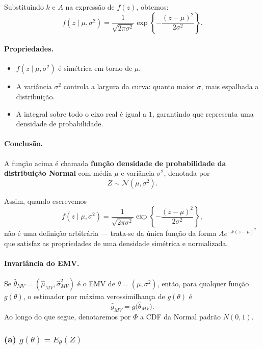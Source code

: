 Substituindo $k$ e $A$ na expressão de $f(z)$, obtemos:
\[
f(z\mid\mu,\sigma^2)
= \frac{1}{\sqrt{2\pi\sigma^2}}
\exp\!\left\{-\frac{(z-\mu)^2}{2\sigma^2}\right\}.
\]

\paragraph{Propriedades.}
\begin{itemize}
    \item $f(z\mid\mu,\sigma^2)$ é simétrica em torno de $\mu$.
    \item A variância $\sigma^2$ controla a largura da curva: quanto maior $\sigma$, mais espalhada a distribuição.
    \item A integral sobre todo o eixo real é igual a $1$, garantindo que representa uma densidade de probabilidade.
\end{itemize}

\paragraph{Conclusão.}
A função acima é chamada \textbf{função densidade de probabilidade da distribuição Normal} com média $\mu$ e variância $\sigma^2$, denotada por
\[
Z \sim \mathcal N(\mu,\sigma^2).
\]

Assim, quando escrevemos
\[
f(z\mid \mu,\sigma^2) = \frac{1}{\sqrt{2\pi\sigma^2}}
\exp\!\left\{-\frac{(z-\mu)^2}{2\sigma^2}\right\},
\]
não é uma definição arbitrária — trata-se da única função da forma $Ae^{-k(z-\mu)^2}$ que satisfaz as propriedades de uma densidade simétrica e normalizada.


\paragraph{Invariância do EMV.}
Se $\widehat\theta_{MV}=(\widehat\mu_{MV},\widehat\sigma^2_{MV})$ é o EMV de $\theta=(\mu,\sigma^2)$,
então, para qualquer função $g(\theta)$, o estimador por máxima verossimilhança de $g(\theta)$ é
\[
\widehat g_{MV}=g\!\big(\widehat\theta_{MV}\big).
\]
Ao longo do que segue, denotaremos por $\Phi$ a CDF da Normal padrão $N(0,1)$.

\subsubsection*{(a) \; $g(\theta)=E_\theta(Z)$}

